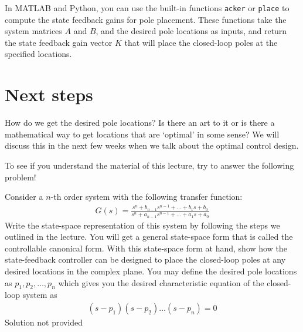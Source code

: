 \documentclass{ee122_notes}
\begin{document}
In MATLAB and Python, you can use the built-in functions \texttt{acker} or \texttt{place} to compute the state feedback gains for pole placement. These functions take the system matrices $A$ and $B$, and the desired pole locations as inputs, and return the state feedback gain vector $K$ that will place the closed-loop poles at the specified locations.

\section{Next steps}
How do we get the desired pole locations? Is there an art to it or is there a mathematical way to get locations that are `optimal' in some sense? We will discuss this in the next few weeks when we talk about the optimal control design. 

To see if you understand the material of this lecture, try to answer the following problem!

\begin{popquiz}
    Consider a $n$-th order system with the following transfer function:
\begin{align*}
    G(s) = \frac{s^n + b_{n-1}s^{n-1} + \dots + b_1 s + b_0}{s^n + a_{n-1}s^{n-1} + \dots + a_1 s + a_0}
\end{align*}
Write the state-space representation of this system by following the steps we outlined in the lecture. You will get a general state-space form that is called the controllable canonical form. With this state-space form at hand, show how the state-feedback controller can be designed to place the closed-loop poles at any desired locations in the complex plane. You may define the desired pole locations as $p_1, p_2, \dots, p_n$ which gives you the desired characteristic equation of the closed-loop system as
\begin{align*}
    (s - p_1)(s - p_2) \dots (s - p_n) = 0
\end{align*}
\popqsplit
Solution not provided
\end{popquiz}
\end{document}
